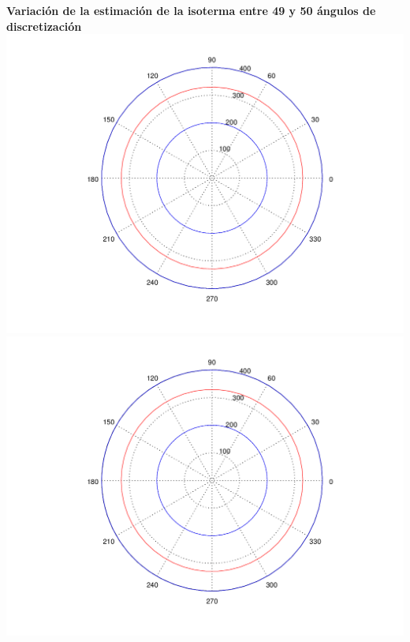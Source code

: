 \begin{enumerate}
	  	\textbf{Variación de la estimación de la isoterma entre 49 y 50 ángulos de discretización}\\
		\includegraphics[scale=0.35]{experimentos1a_1b/evolucion_posicion_isoterma_temperatura/variacion_angulos_radio_fijo_se_suaviza_isoterma/test10_050_radios_049_angulos_inst_001_isomap.png}
		\includegraphics[scale=0.35]{experimentos1a_1b/evolucion_posicion_isoterma_temperatura/variacion_angulos_radio_fijo_se_suaviza_isoterma/test10_050_radios_050_angulos_inst_001_isomap.png}


\end{enumerate}
